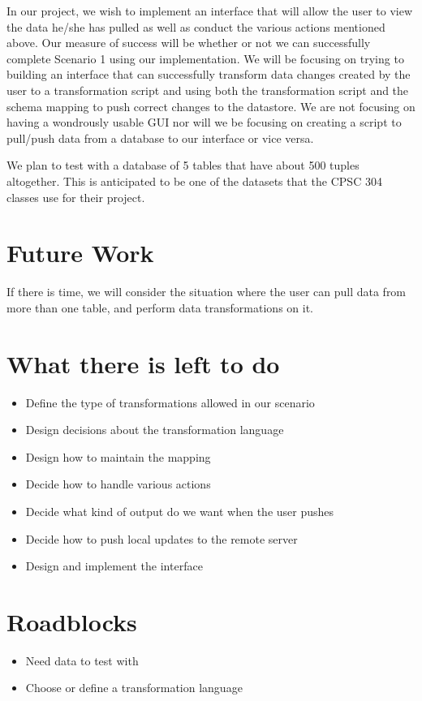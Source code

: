 \documentclass[12pt]{article}
\begin{document}
In our project, we wish to implement an interface that will allow the user to view the data he/she has pulled as well as conduct the various actions mentioned above. Our measure of success will be whether or not we can successfully complete Scenario 1 using our implementation. We will be focusing on trying to building an interface that can successfully transform data changes created by the user to a transformation script and using both the transformation script and the schema mapping to push correct changes to the datastore. We are not focusing on having a wondrously usable GUI nor will we be focusing on creating a script to pull/push data from a database to our interface or vice versa. 

We plan to test with a database of 5 tables that have about 500 tuples altogether. This is anticipated to be one of the datasets that the CPSC 304 classes use for their project.

\section{Future Work}
If there is time, we will consider the situation where the user can pull data from more than one table, and perform data transformations on it.

\section{What there is left to do}
\begin{itemize}
	\item{Define the type of transformations allowed in our scenario}
	\item{Design decisions about the transformation language}
	\item{Design how to maintain the mapping}
	\item{Decide how to handle various actions}
	\item{Decide what kind of output do we want when the user pushes}
	\item{Decide how to push local updates to the remote server}
	\item{Design and implement the interface}
\end{itemize}

\section{Roadblocks}
\begin{itemize}
	\item{Need data to test with}
	\item{Choose or define a transformation language}
\end{itemize} 
\end{document}
